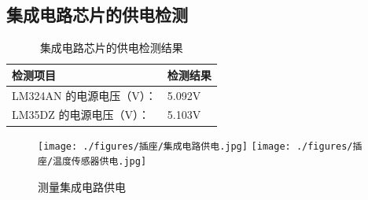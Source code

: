 \subsection{集成电路芯片的供电检测}
\begin{table}[H]
    \centering
    \caption{集成电路芯片的供电检测结果}
    \begin{tabular}{L{.6\textwidth}C{.2\textwidth}}
    \toprule
    检测项目  & 检测结果 \\
    \midrule
    LM324AN 的电源电压（V）： & 5.092V \\
    LM35DZ 的电源电压（V）： &  5.103V \\
    \bottomrule
    \end{tabular}
    \end{table}
    \begin{figure}[H]
        \centering
         \texttt{[image: ./figures/插座/集成电路供电.jpg]}
         \hspace{5em}
         \texttt{[image: ./figures/插座/温度传感器供电.jpg]}
         \caption{测量集成电路供电}
        \end{figure}